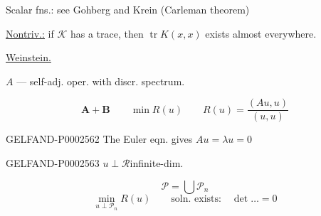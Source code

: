 Scalar fns.: see Gohberg and Krein (Carleman theorem)





\underline{\underline{Nontriv.:}} if $\mathcal K$ has a trace, then $\operatorname{tr}K (x, x)$ exists almost everywhere.





\underline{Weinstein.}





$A$ — self-adj. oper. with discr. spectrum.





\begin{equation*}
\mathbf{A+B}\qquad\min R (u)\qquad R (u)=\frac{(Au, u)}{(u, u)}
\end{equation*}





\begin{GelfandAdjacentEvidence}{GELFAND-P000256}{2}
The Euler eqn. gives $Au=\lambda u=0$

\end{GelfandAdjacentEvidence}


\begin{GelfandAdjacentEvidence}{GELFAND-P000256}{3}
$u\perp\mathcal R$\qquad infinite-dim.

\end{GelfandAdjacentEvidence}


\begin{equation*}
\mathcal P=\bigcup\mathcal P_n
\end{equation*}
\begin{equation*}
\min_{u\perp\mathcal P_n}R (u)\qquad\text{soln. exists:}\quad\det\ldots=0
\end{equation*}





\begin{flushright}
\end{flushright}







